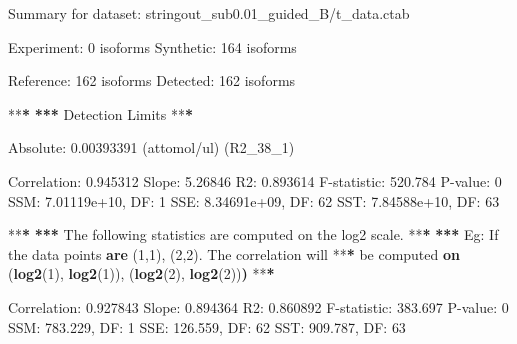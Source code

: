 \documentclass[]{article}
\newenvironment{Shaded}{\begin{snugshade}}{\end{snugshade}}
\newcommand{\KeywordTok}[1]{\textcolor[rgb]{0.13,0.29,0.53}{\textbf{{#1}}}}
\newcommand{\DecValTok}[1]{\textcolor[rgb]{0.00,0.00,0.81}{{#1}}}
\newcommand{\FloatTok}[1]{\textcolor[rgb]{0.00,0.00,0.81}{{#1}}}
\newcommand{\StringTok}[1]{\textcolor[rgb]{0.31,0.60,0.02}{{#1}}}
\newcommand{\ErrorTok}[1]{\textbf{{#1}}}
\newcommand{\NormalTok}[1]{{#1}}
\begin{document}
\begin{Shaded}
\begin{Highlighting}[]
\NormalTok{Summary for dataset:}\StringTok{ }\NormalTok{stringout_sub0.01_guided_B/t_data.ctab}

   \NormalTok{Experiment:}\StringTok{  }\DecValTok{0} \NormalTok{isoforms}
   \NormalTok{Synthetic:}\StringTok{   }\DecValTok{164} \NormalTok{isoforms}

   \NormalTok{Reference:}\StringTok{   }\DecValTok{162} \NormalTok{isoforms}
   \NormalTok{Detected:}\StringTok{    }\DecValTok{162} \NormalTok{isoforms}

   \NormalTok{**}\ErrorTok{*}
\StringTok{   }\ErrorTok{***}\StringTok{ }\NormalTok{Detection Limits}
   \NormalTok{**}\ErrorTok{*}

\StringTok{   }\NormalTok{Absolute:}\StringTok{    }\FloatTok{0.00393391} \NormalTok{(attomol/ul) (R2_38_1)}

   \NormalTok{Correlation:}\StringTok{ }\FloatTok{0.945312}
   \NormalTok{Slope:}\StringTok{       }\FloatTok{5.26846}
   \NormalTok{R2:}\StringTok{          }\FloatTok{0.893614}
   \NormalTok{F-statistic:}\StringTok{ }\FloatTok{520.784}
   \NormalTok{P-value:}\StringTok{     }\DecValTok{0}
   \NormalTok{SSM:}\StringTok{         }\FloatTok{7.01119e+10}\NormalTok{, DF:}\StringTok{ }\DecValTok{1}
   \NormalTok{SSE:}\StringTok{         }\FloatTok{8.34691e+09}\NormalTok{, DF:}\StringTok{ }\DecValTok{62}
   \NormalTok{SST:}\StringTok{         }\FloatTok{7.84588e+10}\NormalTok{, DF:}\StringTok{ }\DecValTok{63}

   \NormalTok{**}\ErrorTok{*}
\StringTok{   }\ErrorTok{***}\StringTok{ }\NormalTok{The following statistics are computed on the log2 scale.}
   \NormalTok{**}\ErrorTok{*}
\StringTok{   }\ErrorTok{***}\StringTok{   }\NormalTok{Eg:}\StringTok{ }\NormalTok{If the data points }\KeywordTok{are} \NormalTok{(}\DecValTok{1}\NormalTok{,}\DecValTok{1}\NormalTok{), (}\DecValTok{2}\NormalTok{,}\DecValTok{2}\NormalTok{). The correlation will}
   \NormalTok{**}\ErrorTok{*}\StringTok{       }\NormalTok{be computed }\KeywordTok{on} \NormalTok{(}\KeywordTok{log2}\NormalTok{(}\DecValTok{1}\NormalTok{), }\KeywordTok{log2}\NormalTok{(}\DecValTok{1}\NormalTok{)), (}\KeywordTok{log2}\NormalTok{(}\DecValTok{2}\NormalTok{), }\KeywordTok{log2}\NormalTok{(}\DecValTok{2}\NormalTok{))}\ErrorTok{)}
   \NormalTok{**}\ErrorTok{*}

\StringTok{   }\NormalTok{Correlation:}\StringTok{ }\FloatTok{0.927843}
   \NormalTok{Slope:}\StringTok{       }\FloatTok{0.894364}
   \NormalTok{R2:}\StringTok{          }\FloatTok{0.860892}
   \NormalTok{F-statistic:}\StringTok{ }\FloatTok{383.697}
   \NormalTok{P-value:}\StringTok{     }\DecValTok{0}
   \NormalTok{SSM:}\StringTok{         }\FloatTok{783.229}\NormalTok{, DF:}\StringTok{ }\DecValTok{1}
   \NormalTok{SSE:}\StringTok{         }\FloatTok{126.559}\NormalTok{, DF:}\StringTok{ }\DecValTok{62}
   \NormalTok{SST:}\StringTok{         }\FloatTok{909.787}\NormalTok{, DF:}\StringTok{ }\DecValTok{63}
\end{Highlighting}
\end{Shaded}
\end{document}
